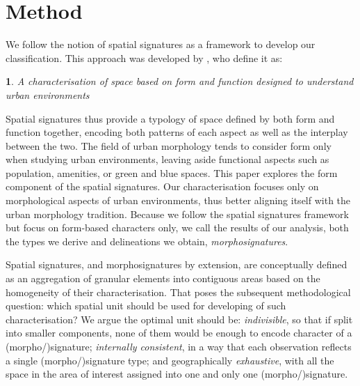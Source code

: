 \section{Method}
\label{sec:meth}

We follow the notion of spatial signatures as a framework
to develop our classification.
This approach was developed by \cite{dab_mf_2021}, who define it as:

\newtheorem*{theorem}{}
\begin{theorem}
    A characterisation of space based on form and function designed to understand urban
environments
\end{theorem}

Spatial signatures thus provide a typology of space defined by both form and function
together, encoding both patterns of each aspect as well as the interplay between the two. 
The field of urban morphology tends to consider form only when studying urban
environments, leaving aside functional aspects such as population, amenities,
or green and blue spaces. 
%
This paper explores the form component of the spatial signatures.
Our characterisation focuses only on morphological aspects of urban
environments, thus better aligning itself with the urban morphology tradition.
Because we follow the spatial signatures framework but focus on form-based
characters only, we call the results of our analysis, both the types we derive
and delineations we obtain, \textit{morphosignatures}.

Spatial signatures, and morphosignatures by extension, are conceptually defined as an aggregation of granular elements into
contiguous areas based on the homogeneity of their characterisation. That
poses the subsequent methodological question: which spatial unit should be
used for developing of such characterisation? We argue the optimal unit should
be: \textit{indivisible}, so that if split into
smaller components, none of them would be enough to encode character of a
(morpho/)signature;
\textit{internally consistent}, in a way that each observation reflects a single (morpho/)signature type;
and geographically \textit{exhaustive}, with all the space in the area of
interest assigned into one and only one (morpho/)signature.

